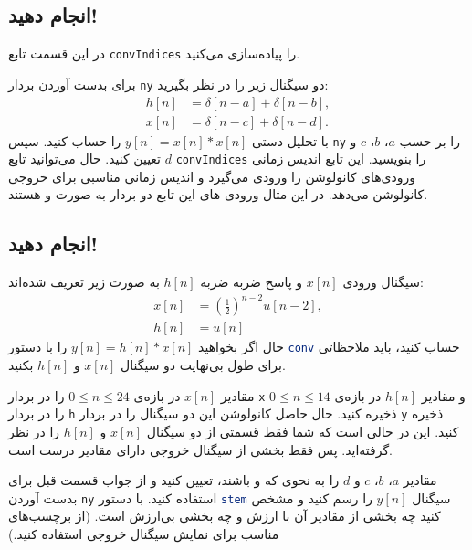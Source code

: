 \documentclass{utsignal}
\begin{document}
	\subsection{انجام دهید!}
	در این قسمت تابع \lstinline[language=Octave]{convIndices} را پیاده‌سازی می‌کنید.
	
	برای بدست آوردن بردار \lstinline[language=Octave]{ny} دو سیگنال زیر را در نظر بگیرید:
	\begin{align*}
	h[n] &= \delta[n - a] + \delta[n - b],\\
	x[n] &= \delta[n - c] + \delta[n - d].
	\end{align*}
	با تحلیل دستی $y[n]=x[n]*x[n]$ را حساب کنید. سپس \lstinline[language=Octave]{ny} را بر حسب $a$، $b$، $c$ و $d$ تعیین کنید. حال می‌توانید تابع  \lstinline[language=Octave]{convIndices} را بنویسید. این تابع اندیس زمانی ورودی‌های کانولوشن را ورودی می‌گیرد و اندیس زمانی مناسبی برای خروجی کانولوشن می‌دهد. در این مثال ورودی های این تابع دو بردار به صورت  و  هستند.
	\subsection{انجام دهید!}
		سیگنال ورودی $x[n]$ و پاسخ ضربه ضربه $h[n]$ به صورت زیر تعریف شده‌اند:
		\begin{align*}
			x[n] &= \left(\frac{1}{2}\right)^{n-2}u[n-2],\\
			h[n]‌&= u[n]
		\end{align*}
		حال اگر بخواهید $y[n]=h[n]*x[n]$ را با دستور \lstinline[language=Octave]{conv} حساب کنید، باید ملاحظاتی برای طول بی‌نهایت دو سیگنال $x[n]$ و $h[n]$ بکنید.
		
		مقادیر $x[n]$ در بازه‌ی $0\le n\le24$ را در بردار \lstinline[language=Octave]{x} و مقادیر $h[n]$ در بازه‌ی $0\le n\le14$ را در بردار \lstinline[language=Octave]{h} ذخیره کنید. حال حاصل کانولوشن این دو سیگنال را در بردار \lstinline[language=Octave]{y} ذخیره کنید. این در حالی است که شما فقط قسمتی از دو سیگنال $x[n]$ و $h[n]$ را در نظر گرفته‌اید. پس فقط بخشی از سیگنال خروجی دارای مقادیر درست است.
		
		مقادیر $a$، $b$، $c$ و $d$ را به نحوی که  و  باشند، تعیین کنید و از جواب قسمت قبل برای بدست آوردن \lstinline[language=Octave]{ny} استفاده کنید. با دستور \lstinline[language=Octave]{stem} سیگنال $y[n]$ را رسم کنید و مشخص کنید چه بخشی از مقادیر آن با ارزش و چه بخشی بی‌ارزش است. (از برچسب‌های مناسب برای نمایش سیگنال خروجی استفاده کنید.)
\end{document}
